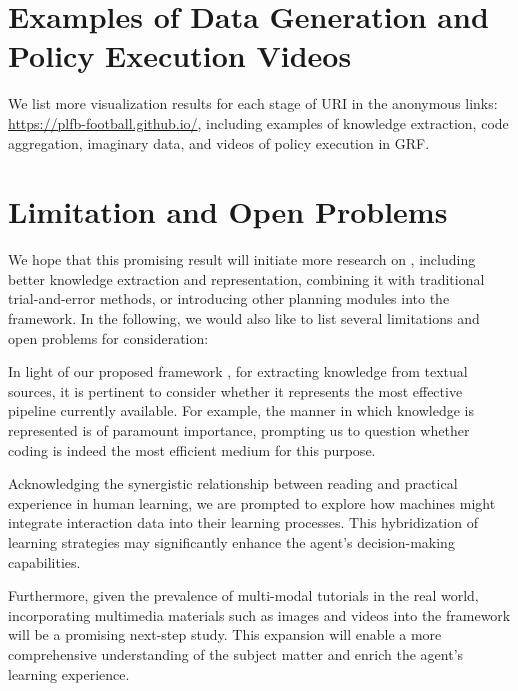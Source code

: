 \section{Examples of Data Generation and Policy Execution Videos}
\label{app:example}
We list more visualization results for each stage of URI in the anonymous links: {\url{https://plfb-football.github.io/}},
including examples of knowledge extraction, code aggregation, imaginary data, and videos of policy execution in GRF.






\section{Limitation and Open Problems}
\label{app:limi}

We hope that this promising result will initiate more research on {\topic}, including better knowledge extraction and representation, combining it with traditional trial-and-error methods, or introducing other planning modules into the framework. In the following, we would also like to list several limitations and open problems for consideration:

In light of our proposed framework \algo, for extracting knowledge from textual sources, it is pertinent to consider whether it represents the most effective pipeline currently available. For example, the manner in which knowledge is represented is of paramount importance, prompting us to question whether coding is indeed the most efficient medium for this purpose.

Acknowledging the synergistic relationship between reading and practical experience in human learning, we are prompted to explore how machines might integrate interaction data into their learning processes. This hybridization of learning strategies may significantly enhance the agent’s decision-making capabilities.

Furthermore, given the prevalence of multi-modal tutorials in the real world, incorporating multimedia materials such as images and videos into the framework will be a promising next-step study. This expansion will enable a more comprehensive understanding of the subject matter and enrich the agent's learning experience.

